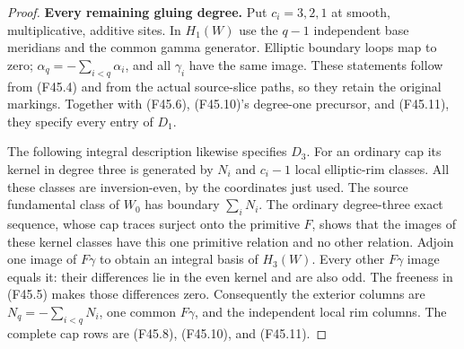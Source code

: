 \begin{proof}
\par\medskip\noindent\textbf{Every remaining gluing degree.}\enspace
Put $c_i=3,2,1$ at smooth, multiplicative, additive sites.
In $H_1(W)$ use the $q-1$ independent base meridians and the
common gamma generator. Elliptic boundary loops map to zero;
$\alpha_q=-\sum_{i<q}\alpha_i$, and all $\gamma_i$ have the
same image. These statements follow from (F45.4) and from the
actual source-slice paths, so they retain the original markings.
Together with (F45.6), (F45.10)'s degree-one precursor, and
(F45.11), they specify every entry of $D_1$.

The following integral description likewise specifies $D_3$.
For an ordinary cap its kernel in degree three is generated by
$N_i$ and $c_i-1$ local elliptic-rim classes. All these classes
are inversion-even, by the coordinates just used. The source
fundamental class of $W_0$ has boundary $\sum_iN_i$.
The ordinary degree-three exact sequence, whose cap traces
surject onto the primitive $F$, shows that the images of these
kernel classes have this one primitive relation and no other
relation. Adjoin one image of $F\gamma$ to obtain an integral
basis of $H_3(W)$. Every other $F\gamma$ image equals it:
their differences lie in the even kernel and are also odd.
The freeness in (F45.5) makes those differences zero.
Consequently the exterior columns are $N_q=-\sum_{i<q}N_i$,
one common $F\gamma$, and the independent local rim columns.
The complete cap rows are (F45.8), (F45.10), and (F45.11).


\end{proof}
